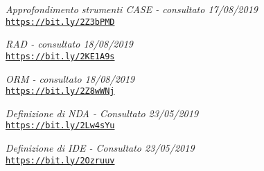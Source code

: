 \begin{thebibliography}{99}
	\bibitem{[12]} \label{bib12}
	\textit{Approfondimento strumenti CASE - consultato 17/08/2019}\\
	\texttt{\url{https://bit.ly/2Z3bPMD}}		


	\bibitem{[13]} \label{bib13}
	\textit{RAD - consultato 18/08/2019}\\
	\texttt{\url{https://bit.ly/2KE1A9s}}		
	
	
	\bibitem{[14]} \label{bib14}
	\textit{ORM - consultato 18/08/2019}\\
	\texttt{\url{https://bit.ly/2Z8wWNj}}		

	
	\bibitem{[15]} \label{bib15}
	\textit{Definizione di NDA - Consultato 23/05/2019}\\
	\texttt{\url{https://bit.ly/2Lw4sYu}}
	
	\bibitem{[16]} \label{bib16}
	\textit{Definizione di IDE - Consultato 23/05/2019}\\
	\texttt{\url{https://bit.ly/2Ozruuv}}
	
\end{thebibliography}




